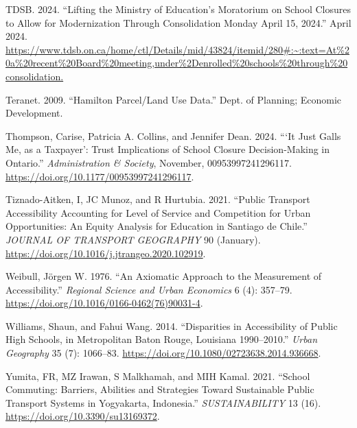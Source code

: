 \documentclass[
default
]{sn-jnl}
\newlength{\cslhangindent}
\newenvironment{CSLReferences}[2] %
 {\begin{list}{}{%
  \setlength{\itemindent}{0pt}
  \setlength{\leftmargin}{0pt}
  \setlength{\parsep}{0pt}
  \ifodd #1
   \setlength{\leftmargin}{\cslhangindent}
   \setlength{\itemindent}{-1\cslhangindent}
  \fi
  \setlength{\itemsep}{#2\baselineskip}}}
 {\end{list}}
\begin{document}
\begin{CSLReferences}{1}{0}
TDSB. 2024. {``Lifting the Ministry of Education's Moratorium on School
Closures to Allow for Modernization Through Consolidation Monday April
15, 2024.''} April 2024.
\url{https://www.tdsb.on.ca/home/ctl/Details/mid/43824/itemid/280\#:~:text=At\%20a\%20recent\%20Board\%20meeting,under\%2Denrolled\%20schools\%20through\%20consolidation.}

Teranet. 2009. {``Hamilton Parcel/Land Use Data.''} Dept. of Planning;
Economic Development.

Thompson, Carise, Patricia A. Collins, and Jennifer Dean. 2024. {``{`It
Just Galls Me, as a Taxpayer'}: Trust Implications of School Closure
Decision-Making in Ontario.''} \emph{Administration \& Society},
November, 00953997241296117.
\url{https://doi.org/10.1177/00953997241296117}.

Tiznado-Aitken, I, JC Munoz, and R Hurtubia. 2021. {``Public Transport
Accessibility Accounting for Level of Service and Competition for Urban
Opportunities: An Equity Analysis for Education in Santiago de Chile.''}
\emph{{JOURNAL} {OF} {TRANSPORT} {GEOGRAPHY}} 90 (January).
\url{https://doi.org/10.1016/j.jtrangeo.2020.102919}.

Weibull, Jörgen W. 1976. {``An Axiomatic Approach to the Measurement of
Accessibility.''} \emph{Regional Science and Urban Economics} 6 (4):
357--79. \url{https://doi.org/10.1016/0166-0462(76)90031-4}.

Williams, Shaun, and Fahui Wang. 2014. {``Disparities in Accessibility
of Public High Schools, in Metropolitan Baton Rouge, Louisiana
1990--2010.''} \emph{Urban Geography} 35 (7): 1066--83.
\url{https://doi.org/10.1080/02723638.2014.936668}.

Yumita, FR, MZ Irawan, S Malkhamah, and MIH Kamal. 2021. {``School
Commuting: Barriers, Abilities and Strategies Toward Sustainable Public
Transport Systems in Yogyakarta, Indonesia.''} \emph{{SUSTAINABILITY}}
13 (16). \url{https://doi.org/10.3390/su13169372}.

\end{CSLReferences}
\end{document}
